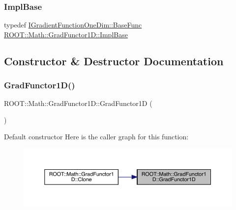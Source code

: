 \mbox{\label{classROOT_1_1Math_1_1GradFunctor1D_a16b436a0d100aa6c16ee66961c4f5b97}} 
\subsubsection{\texorpdfstring{ImplBase}{ImplBase}\hspace{0.1cm}{\footnotesize\ttfamily [2/2]}}
{\footnotesize\ttfamily typedef \mbox{\hyperlink{classROOT_1_1Math_1_1IGradientFunctionOneDim_a9eae6bcbeb2d0396937710bd70bd29d0}{I\+Gradient\+Function\+One\+Dim\+::\+Base\+Func}} \mbox{\hyperlink{classROOT_1_1Math_1_1GradFunctor1D_a16b436a0d100aa6c16ee66961c4f5b97}{R\+O\+O\+T\+::\+Math\+::\+Grad\+Functor1\+D\+::\+Impl\+Base}}}



\subsection{Constructor \& Destructor Documentation}
\mbox{\label{classROOT_1_1Math_1_1GradFunctor1D_a8691d070a442abf40d5709588edf93fe}} 
\subsubsection{\texorpdfstring{GradFunctor1D()}{GradFunctor1D()}\hspace{0.1cm}{\footnotesize\ttfamily [1/10]}}
{\footnotesize\ttfamily R\+O\+O\+T\+::\+Math\+::\+Grad\+Functor1\+D\+::\+Grad\+Functor1D (\begin{DoxyParamCaption}{ }\end{DoxyParamCaption})\hspace{0.3cm}{\ttfamily [inline]}}

Default constructor Here is the caller graph for this function\+:\nopagebreak
\begin{figure}[H]
\begin{center}
\leavevmode
\includegraphics[width=350pt]{d3/d76/classROOT_1_1Math_1_1GradFunctor1D_a8691d070a442abf40d5709588edf93fe_icgraph}
\end{center}
\end{figure}
\mbox{\label{classROOT_1_1Math_1_1GradFunctor1D_a740a6020efe7284e5eca301a89a127e8}} 
